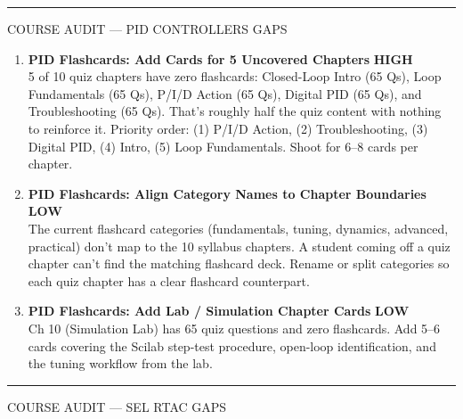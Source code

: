 \documentclass[10pt]{article}
\newcommand{\high}{\textcolor{sred}{\small\bfseries HIGH}}
\newcommand{\low}{\textcolor{sgreen}{\small\bfseries LOW}}
\begin{document}
\smallskip
{\color{snavy}\rule{\linewidth}{0.4pt}}
\smallskip

{\small\sffamily\color{sgray}\MakeUppercase{Course Audit — PID Controllers Gaps}}
\smallskip

\begin{enumerate}[resume]\small
  \item \textbf{PID Flashcards: Add Cards for 5 Uncovered Chapters} \hfill \high \\
    5 of 10 quiz chapters have zero flashcards: Closed-Loop Intro (65 Qs), Loop Fundamentals (65 Qs), P/I/D Action (65 Qs), Digital PID (65 Qs), and Troubleshooting (65 Qs). That's roughly half the quiz content with nothing to reinforce it. Priority order: (1) P/I/D Action, (2) Troubleshooting, (3) Digital PID, (4) Intro, (5) Loop Fundamentals. Shoot for 6--8 cards per chapter.

  \item \textbf{PID Flashcards: Align Category Names to Chapter Boundaries} \hfill \low \\
    The current flashcard categories (fundamentals, tuning, dynamics, advanced, practical) don't map to the 10 syllabus chapters. A student coming off a quiz chapter can't find the matching flashcard deck. Rename or split categories so each quiz chapter has a clear flashcard counterpart.

  \item \textbf{PID Flashcards: Add Lab / Simulation Chapter Cards} \hfill \low \\
    Ch 10 (Simulation Lab) has 65 quiz questions and zero flashcards. Add 5--6 cards covering the Scilab step-test procedure, open-loop identification, and the tuning workflow from the lab.
\end{enumerate}

\smallskip
{\color{snavy}\rule{\linewidth}{0.4pt}}
\smallskip

{\small\sffamily\color{sgray}\MakeUppercase{Course Audit — SEL RTAC Gaps}}
\smallskip
\end{document}
